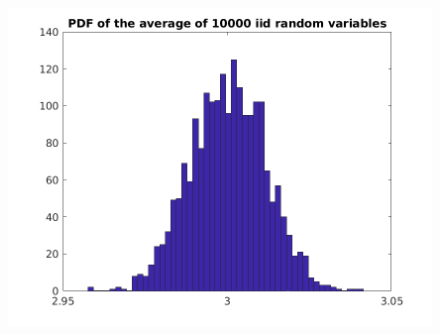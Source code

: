 \documentclass{article}
\begin{document}
\begin{figure}[H]
    {\includegraphics[width =12cm, height=9cm]{10000.png}}
    \end{figure}
\end{document}
